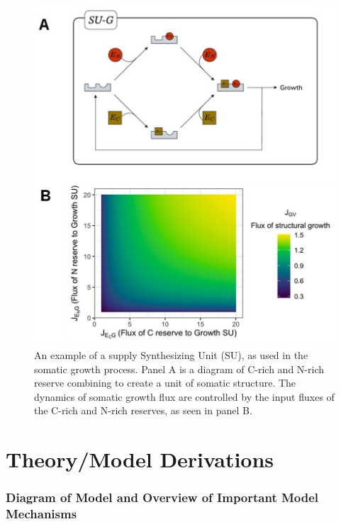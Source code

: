 \documentclass[
]{article}
\begin{document}
\begin{figure}
\centering
\includegraphics{SU_diagram_example.jpg}
\caption{An example of a supply Synthesizing Unit (SU), as used in the
somatic growth process. Panel A is a diagram of C-rich and N-rich
reserve combining to create a unit of somatic structure. The dynamics of
somatic growth flux are controlled by the input fluxes of the C-rich and
N-rich reserves, as seen in panel B.}
\end{figure}

\newpage

\section{Theory/Model Derivations}\label{theorymodel-derivations}

\subsubsection{Diagram of Model and Overview of Important Model
Mechanisms}\label{diagram-of-model-and-overview-of-important-model-mechanisms}
\end{document}
